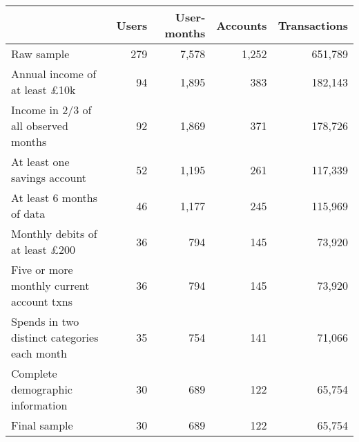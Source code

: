 \begin{tabular}{lrrrr}
\toprule
                                             & Users & User-months & Accounts & Transactions \\
\midrule
                                  Raw sample &   279 &       7,578 &    1,252 &      651,789 \\
        Annual income of at least \pounds10k &    94 &       1,895 &      383 &      182,143 \\
        Income in 2/3 of all observed months &    92 &       1,869 &      371 &      178,726 \\
                At least one savings account &    52 &       1,195 &      261 &      117,339 \\
                   At least 6 months of data &    46 &       1,177 &      245 &      115,969 \\
       Monthly debits of at least \pounds200 &    36 &         794 &      145 &       73,920 \\
   Five or more monthly current account txns &    36 &         794 &      145 &       73,920 \\
Spends in two distinct categories each month &    35 &         754 &      141 &       71,066 \\
            Complete demographic information &    30 &         689 &      122 &       65,754 \\
                                Final sample &    30 &         689 &      122 &       65,754 \\
\bottomrule
\end{tabular}
